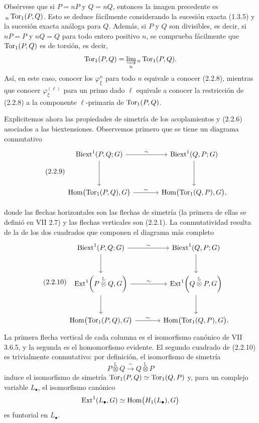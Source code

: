 Obsérvese que si $P=nP$ y $Q=nQ$, entonces la imagen precedente es
$\,{}_n\operatorname{Tor}_1(P,Q)$. Esto se deduce fácilmente considerando la
sucesión exacta (1.3.5) y la sucesión exacta análoga para $Q$.
Además, si $P$ y $Q$ son divisibles, es decir, si $nP=P$ y $nQ=Q$
para todo entero positivo $n$, se comprueba fácilmente que
$\operatorname{Tor}_1(P,Q)$ es de torsión, es decir,
\[
 \operatorname{Tor}_1(P,Q)=\varinjlim_n{}_{n}\operatorname{Tor}_1(P,Q).
\]
Así, en este caso, conocer los $\varphi^n_\xi$ para todo $n$ equivale
a conocer (2.2.8), mientras que conocer $\varphi^{(\ell)}_\xi$ para
un primo dado $\ell$ equivale a conocer la restricción de (2.2.8) a
la componente $\ell$-primaria de $\operatorname{Tor}_1(P,Q)$.

Explicitemos ahora las propiedades de simetría de los acoplamientos
 y (2.2.6) asociados a las biextensiones.
Observemos primero que se tiene un diagrama conmutativo
\begin{equation}\tag{2.2.9}
\begin{tikzcd}[column sep=large,row sep=huge]
 \Biext^1(P,Q;G)
   \arrow[r,"\sim"]
   \arrow[d]&
 \Biext^1(Q,P;G)
   \arrow[d]\\
 \Hom\bigl(\uTor_1(P,Q),G\bigr)
   \arrow[r,"\sim"]&
 \Hom\bigl(\uTor_1(Q,P),G\bigr),
\end{tikzcd}
\end{equation}


donde las flechas horizontales son las flechas de simetría (la primera
de ellas se definió en VII 2.7) y las flechas verticales son (2.2.1).
La conmutatividad resulta de la de los dos cuadrados que componen el
diagrama más completo
\begin{equation}\tag{2.2.10}
\begin{tikzcd}[column sep=large,row sep=large]
 \Biext^1(P,Q;G)
   \arrow[r,"\sim"]
   \arrow[d]&
 \Biext^1(Q,P;G)
   \arrow[d]\\
 \Ext^1\!\left(P\mathbin{\overset{\mathbb L}{\otimes}}Q,G\right)
   \arrow[r,"\sim"]
   \arrow[d]&
 \Ext^1\!\left(Q\mathbin{\overset{\mathbb L}{\otimes}}P,G\right)
   \arrow[d]\\
 \Hom\bigl(\uTor_1(P,Q),G\bigr)
   \arrow[r,"\sim"]&
 \Hom\bigl(\uTor_1(Q,P),G\bigr).
\end{tikzcd}
\end{equation}
La primera flecha vertical de cada columna es el isomorfismo canónico
de VII 3.6.5, y la segunda es el homomorfismo evidente. El segundo
cuadrado de (2.2.10) es trivialmente conmutativo: por definición, el
isomorfismo de simetría
\[
 P\mathbin{\overset{\mathbb L}{\otimes}}Q
 \xrightarrow{\ \sim\ }
 Q\mathbin{\overset{\mathbb L}{\otimes}}P
\]
induce el isomorfismo de simetría
$\operatorname{Tor}_1(P,Q)\simeq\operatorname{Tor}_1(Q,P)$ y, para un complejo variable
$L_\bullet$, el isomorfismo canónico
\[
 \operatorname{Ext}^1(L_\bullet,G)
 \simeq
 \operatorname{Hom}\bigl(H_1(L_\bullet),G\bigr)
\]
es funtorial en $L_\bullet$.

